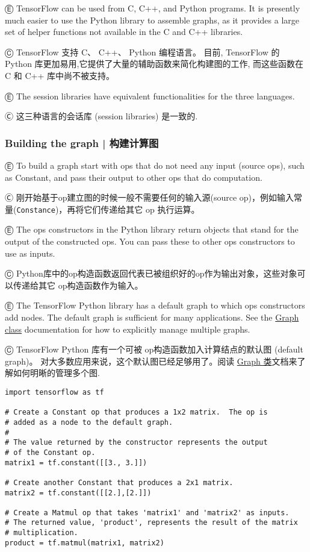 Ⓔ \textcolor{etc}{TensorFlow can be used from C, C++, and Python programs. It is presently much easier to use the Python library to assemble graphs, as it provides a large set of helper functions not available in the C and C++ libraries.}

Ⓒ TensorFlow 支持 C、 C++、 Python 编程语言。 目前, TensorFlow 的 Python 库更加易用,它提供了大量的辅助函数来简化构建图的工作, 而这些函数在 C 和 C++ 库中尚不被支持。

Ⓔ \textcolor{etc}{The session libraries have equivalent functionalities for the three languages.}

Ⓒ 这三种语言的会话库 (session libraries) 是一致的.

\subsubsection {Building the graph  |  构建计算图}

Ⓔ \textcolor{etc}{To build a graph start with ops that do not need any input (source ops), such as Constant, and pass their output to other ops that do computation.}

Ⓒ 刚开始基于op建立图的时候一般不需要任何的输入源(source op)，例如输入常量(\lstinline{Constance})，再将它们传递给其它 op 执行运算。

Ⓔ \textcolor{etc}{The ops constructors in the Python library return objects that stand for the output of the constructed ops. You can pass these to other ops constructors to use as inputs.}

Ⓒ Python库中的op构造函数返回代表已被组织好的op作为输出对象，这些对象可以传递给其它
op构造函数作为输入。

Ⓔ \textcolor{etc}{The TensorFlow Python library has a default graph to which ops constructors add nodes. The default graph is sufficient for many applications. See the \hyperref[class-tf.graph]{Graph class} documentation for how to explicitly manage multiple graphs.}

Ⓒ TensorFlow Python 库有一个可被 op构造函数加入计算结点的默认图 (default graph)。 对大多数应用来说，这个默认图已经足够用了。阅读 \hyperref[class-tf.graph]{Graph 类}文档来了解如何明晰的管理多个图.

\begin{lstlisting}
import tensorflow as tf

# Create a Constant op that produces a 1x2 matrix.  The op is
# added as a node to the default graph.
#
# The value returned by the constructor represents the output
# of the Constant op.
matrix1 = tf.constant([[3., 3.]])

# Create another Constant that produces a 2x1 matrix.
matrix2 = tf.constant([[2.],[2.]])

# Create a Matmul op that takes 'matrix1' and 'matrix2' as inputs.
# The returned value, 'product', represents the result of the matrix
# multiplication.
product = tf.matmul(matrix1, matrix2)
\end{lstlisting}

